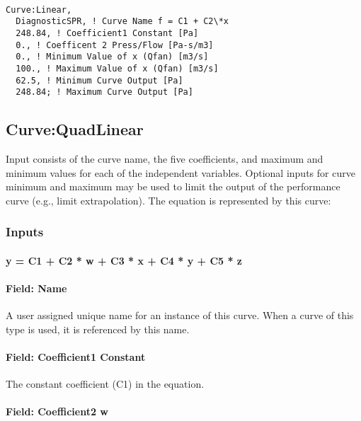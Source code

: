 \begin{lstlisting}

Curve:Linear,
  DiagnosticSPR, ! Curve Name f = C1 + C2\*x
  248.84, ! Coefficient1 Constant [Pa]
  0., ! Coefficent 2 Press/Flow [Pa-s/m3]
  0., ! Minimum Value of x (Qfan) [m3/s]
  100., ! Maximum Value of x (Qfan) [m3/s]
  62.5, ! Minimum Curve Output [Pa]
  248.84; ! Maximum Curve Output [Pa]
\end{lstlisting}

\subsection{Curve:QuadLinear}\label{curvequadlinear}

Input consists of the curve name, the five coefficients, and maximum and minimum values for each of the independent variables. Optional inputs for curve minimum and maximum may be used to limit the output of the performance curve (e.g., limit extrapolation). The equation is represented by this curve:

\subsubsection{Inputs}\label{inputs-1-028}

\paragraph{y = C1 + C2 * w + C3 * x + C4 * y + C5 * z}\label{y-c1-c2-w-c3-x-c4-y-c5-z}

\paragraph{Field: Name}\label{field-name-1-027}

A user assigned unique name for an instance of this curve. When a curve of this type is used, it is referenced by this name.

\paragraph{Field: Coefficient1 Constant}\label{field-coefficient1-constant-1}

The constant coefficient (C1) in the equation.

\paragraph{Field: Coefficient2 w}\label{field-coefficient2-w}

